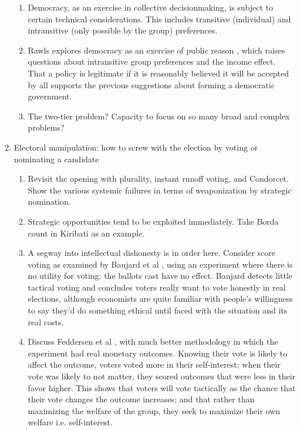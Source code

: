 \begin{enumerate}
\begin{enumerate}
        \item \technical Democracy, as an exercise in collective decisionmaking, is subject to certain technical considerations.  This includes transitive (individual) and intransitive (only possible by the group) preferences.

        \item \philosophical Rawls explores democracy as an exercise of public reason \autocite{Rawls1997}, which raises questions about intransitive group preferences and the income effect.  That a policy is legitimate if it is reasonably believed it will be accepted by all supports the previous suggestions about forming a democratic government.

        \item \technical The two-tier problem? Capacity to focus on so many broad and complex problems?


    \end{enumerate}

    \item Electoral manipulation:  how to screw with the election by voting or nominating a candidate
    \begin{enumerate}
        \item \technical Revisit the opening with plurality, instant runoff voting, and Condorcet.  Show the various systemic failures in terms of weaponization by strategic nomination.

        \item \technical Strategic opportunities tend to be exploited immediately.  Take Borda count in Kiribati \autocite{Reilly2002} as an example.

        \item \technical A segway into intellectual dishonesty is in order here.  Consider score voting as examined by Baujard et al \autocite{Baujard2014}, using an experiment where there is no utility for voting:  the ballots cast have no effect.  Baujard detects little tactical voting and concludes voters really want to vote honestly in real elections, although economists are quite familiar with people's willingness to say they'd do something ethical until faced with the situation and its real costs.

        \item \technical Discuss Feddersen et al \autocite{Feddersen2009}, with much better methodology in which the experiment had real monetary outcomes.  Knowing their vote is likely to affect the outcome, voters voted more in their self-interest; when their vote was likely to not matter, they scored outcomes that were less in their favor higher.  This shows that voters will vote tactically as the chance that their vote changes the outcome increases; and that rather than maximizing the welfare of the group, they seek to maximize their own welfare i.e. self-interest.


\end{enumerate}
\end{enumerate}
